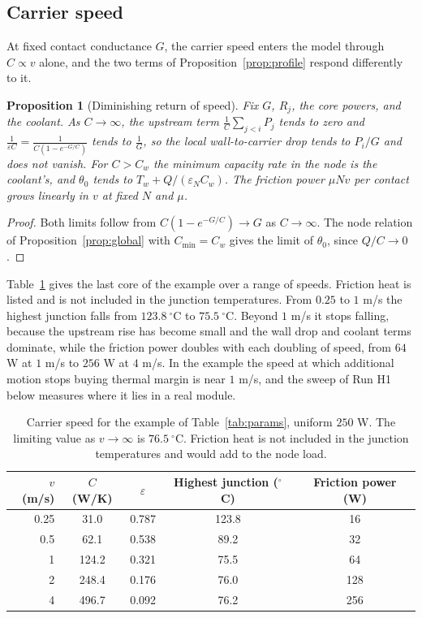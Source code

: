 \documentclass[11pt]{article}
\theoremstyle{definition}
\theoremstyle{plain}
\newtheorem{proposition}{Proposition}[section]
\theoremstyle{remark}
\begin{document}
\subsection{Carrier speed}
\label{sec:speed}

At fixed contact conductance $G$, the carrier speed enters the model through $C\propto v$ alone, and the two terms of Proposition~\ref{prop:profile} respond differently to it.

\begin{proposition}[Diminishing return of speed]\label{prop:speed}
Fix $G$, $R_j$, the core powers, and the coolant. As $C\to\infty$, the upstream term $\frac1C\sum_{j<i}P_j$ tends to zero and $\frac{1}{\varepsilon C}=\frac{1}{C(1-e^{-G/C})}$ tends to $\frac1G$, so the local wall-to-carrier drop tends to $P_i/G$ and does not vanish. For $C>C_w$ the minimum capacity rate in the node is the coolant's, and $\theta_0$ tends to $T_w+Q/(\varepsilon_N C_w)$. The friction power $\mu N v$ per contact grows linearly in $v$ at fixed $N$ and $\mu$.
\end{proposition}
\begin{proof}
Both limits follow from $C(1-e^{-G/C})\to G$ as $C\to\infty$. The node relation of Proposition~\ref{prop:global} with $C_{\min}=C_w$ gives the limit of $\theta_0$, since $Q/C\to0$.
\end{proof}

Table~\ref{tab:speed} gives the last core of the example over a range of speeds. Friction heat is listed and is not included in the junction temperatures. From $0.25$ to $1$ m/s the highest junction falls from $123.8\ ^\circ$C to $75.5\ ^\circ$C. Beyond $1$ m/s it stops falling, because the upstream rise has become small and the wall drop and coolant terms dominate, while the friction power doubles with each doubling of speed, from $64$ W at $1$ m/s to $256$ W at $4$ m/s. In the example the speed at which additional motion stops buying thermal margin is near $1$ m/s, and the sweep of Run H1 below measures where it lies in a real module.

\begin{table}[t]
\centering
\small
\begin{tabular}{@{}rcccc@{}}
\toprule
$v$ (m/s) & $C$ (W/K) & $\varepsilon$ & Highest junction ($^\circ$C) & Friction power (W) \\
\midrule
0.25 & 31.0 & 0.787 & 123.8 & 16 \\
0.5 & 62.1 & 0.538 & 89.2 & 32 \\
1 & 124.2 & 0.321 & 75.5 & 64 \\
2 & 248.4 & 0.176 & 76.0 & 128 \\
4 & 496.7 & 0.092 & 76.2 & 256 \\
\bottomrule
\end{tabular}
\caption{Carrier speed for the example of Table~\ref{tab:params}, uniform $250$ W. The limiting value as $v\to\infty$ is $76.5\ ^\circ$C. Friction heat is not included in the junction temperatures and would add to the node load.}
\label{tab:speed}
\end{table}
\end{document}
